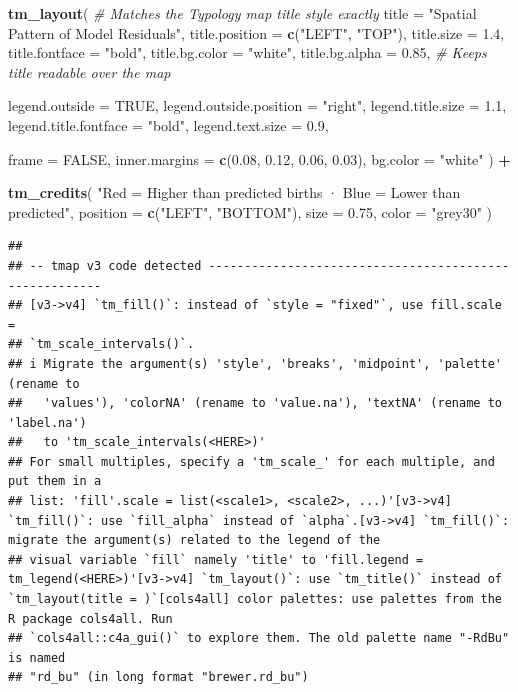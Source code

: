 \documentclass[
]{article}
\newenvironment{Shaded}{\begin{snugshade}}{\end{snugshade}}
\newcommand{\AttributeTok}[1]{\textcolor[rgb]{0.13,0.29,0.53}{#1}}
\newcommand{\CommentTok}[1]{\textcolor[rgb]{0.56,0.35,0.01}{\textit{#1}}}
\newcommand{\ConstantTok}[1]{\textcolor[rgb]{0.56,0.35,0.01}{#1}}
\newcommand{\FloatTok}[1]{\textcolor[rgb]{0.00,0.00,0.81}{#1}}
\newcommand{\FunctionTok}[1]{\textcolor[rgb]{0.13,0.29,0.53}{\textbf{#1}}}
\newcommand{\NormalTok}[1]{#1}
\newcommand{\SpecialCharTok}[1]{\textcolor[rgb]{0.81,0.36,0.00}{\textbf{#1}}}
\newcommand{\StringTok}[1]{\textcolor[rgb]{0.31,0.60,0.02}{#1}}
\begin{document}
\begin{Shaded}
\begin{Highlighting}[]
  \FunctionTok{tm\_layout}\NormalTok{(}
    \CommentTok{\# Matches the Typology map title style exactly}
    \AttributeTok{title =} \StringTok{"Spatial Pattern of Model Residuals"}\NormalTok{,}
    \AttributeTok{title.position =} \FunctionTok{c}\NormalTok{(}\StringTok{"LEFT"}\NormalTok{, }\StringTok{"TOP"}\NormalTok{),}
    \AttributeTok{title.size =} \FloatTok{1.4}\NormalTok{,}
    \AttributeTok{title.fontface =} \StringTok{"bold"}\NormalTok{,}
    \AttributeTok{title.bg.color =} \StringTok{"white"}\NormalTok{,}
    \AttributeTok{title.bg.alpha =} \FloatTok{0.85}\NormalTok{, }\CommentTok{\# Keeps title readable over the map}

    \AttributeTok{legend.outside =} \ConstantTok{TRUE}\NormalTok{,}
    \AttributeTok{legend.outside.position =} \StringTok{"right"}\NormalTok{,}
    \AttributeTok{legend.title.size =} \FloatTok{1.1}\NormalTok{,}
    \AttributeTok{legend.title.fontface =} \StringTok{"bold"}\NormalTok{,}
    \AttributeTok{legend.text.size =} \FloatTok{0.9}\NormalTok{,}

    \AttributeTok{frame =} \ConstantTok{FALSE}\NormalTok{,}
    \AttributeTok{inner.margins =} \FunctionTok{c}\NormalTok{(}\FloatTok{0.08}\NormalTok{, }\FloatTok{0.12}\NormalTok{, }\FloatTok{0.06}\NormalTok{, }\FloatTok{0.03}\NormalTok{), }
    \AttributeTok{bg.color =} \StringTok{"white"}
\NormalTok{  ) }\SpecialCharTok{+}
  
  \FunctionTok{tm\_credits}\NormalTok{(}
    \StringTok{"Red = Higher than predicted births · Blue = Lower than predicted"}\NormalTok{,}
    \AttributeTok{position =} \FunctionTok{c}\NormalTok{(}\StringTok{"LEFT"}\NormalTok{, }\StringTok{"BOTTOM"}\NormalTok{),}
    \AttributeTok{size =} \FloatTok{0.75}\NormalTok{,}
    \AttributeTok{color =} \StringTok{"grey30"}
\NormalTok{  )}
\end{Highlighting}
\end{Shaded}

\begin{verbatim}
## 
## -- tmap v3 code detected -------------------------------------------------------
## [v3->v4] `tm_fill()`: instead of `style = "fixed"`, use fill.scale =
## `tm_scale_intervals()`.
## i Migrate the argument(s) 'style', 'breaks', 'midpoint', 'palette' (rename to
##   'values'), 'colorNA' (rename to 'value.na'), 'textNA' (rename to 'label.na')
##   to 'tm_scale_intervals(<HERE>)'
## For small multiples, specify a 'tm_scale_' for each multiple, and put them in a
## list: 'fill'.scale = list(<scale1>, <scale2>, ...)'[v3->v4] `tm_fill()`: use `fill_alpha` instead of `alpha`.[v3->v4] `tm_fill()`: migrate the argument(s) related to the legend of the
## visual variable `fill` namely 'title' to 'fill.legend = tm_legend(<HERE>)'[v3->v4] `tm_layout()`: use `tm_title()` instead of `tm_layout(title = )`[cols4all] color palettes: use palettes from the R package cols4all. Run
## `cols4all::c4a_gui()` to explore them. The old palette name "-RdBu" is named
## "rd_bu" (in long format "brewer.rd_bu")
\end{verbatim}
\end{document}
